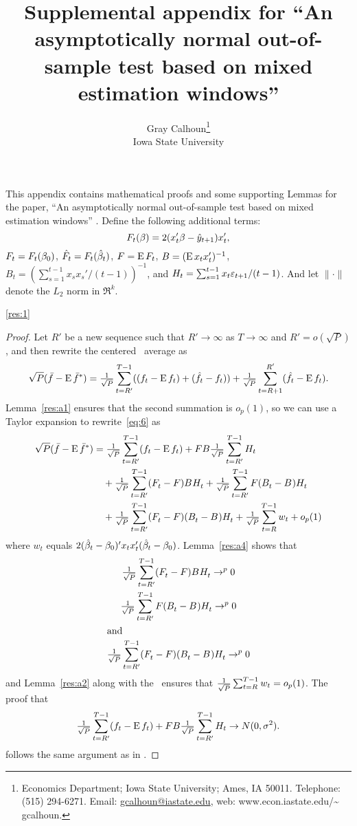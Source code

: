\documentclass[12pt,fleqn]{article}
\author{Gray Calhoun\thanks{Economics Department; Iowa State
    University; Ames, IA 50011.  Telephone: (515) 294-6271.  Email:
    \guillemotleft \protect\url{gcalhoun@iastate.edu}\guillemotright,
    web: \guillemotleft www.econ.iastate.edu/\textasciitilde
    gcalhoun\guillemotright.}\\%
  Iowa State University}
\title{Supplemental appendix for ``An asymptotically normal
  out-of-sample test based on mixed estimation windows''}
\newcommand{\WesA}[1][]{\ocltb{t}
  (F_t^{#1} - F) B^{#1} H_t^{#1}}
\newcommand{\WesB}[1][]{\ocltb{t} F (B_t^{#1} -
  B^{#1}) H_t^{#1}}
\newcommand{\WesC}[1][]{\ocltb{t}
  (F_t^{#1} - F) (B_t^{#1} - B^{#1}) H_t^{#1}}
\begin{document}
\maketitle

\noindent%
This appendix contains mathematical proofs and some supporting Lemmas
for the paper, ``An asymptotically normal out-of-sample test based on
mixed estimation windows'' \citep{Cal:15}. Define the following
additional terms:
\begin{equation*}
  F_t(\beta) = 2 (x_t'\beta - \hat{y}_{t+1}) x_t',
\end{equation*}
$F_t = F_t(\btrue)$, $\hat{F}_t = F_t(\hat{\beta}_t)$, $F = \operatorname{E} F_t$, $B = (\operatorname{E} x_t
x_t')^{-1}$, $B_t = (\sum_{s=1}^{t-1} x_s x_s' / (t-1))^{-1}$, and
$H_t = \sum_{s=1}^{t-1} x_t \varepsilon_{t+1} / (t-1)$.
And let $\lVert \cdot \rVert$ denote the $L_2$ norm in $\Re^k$.

\begin{rthm}{\ref{res:1}}\end{rthm}
\begin{proof}
  Let $R'$ be a new sequence such that $R' \to \infty$ as $T \to \infty$
  and $R' = o(\sqrt{P})$, and then rewrite the centered \oos\ average as
  \begin{equation}\label{eq:6}
    \sqrt{P} (\bar{f} - \operatorname{E} \bar{f}^*)
    = \tfrac{1}{\sqrt{P}} \sum_{t=R'}^{T-1} ((f_t - \operatorname{E} f_t) + (\hat{f}_t - f_t))
      + \tfrac{1}{\sqrt{P}} \sum_{t=R+1}^{R'} (\hat{f}_t - \operatorname{E} f_t).
  \end{equation}
  Lemma~\ref{res:a1} ensures that the second summation is $o_p(1)$, so
  we can use a Taylor expansion to rewrite~\eqref{eq:6} as
  \begin{align*}
    \sqrt{P} (\fb - \E \fb^*)
    &= \ocltb{t} (f_t - \E f_t) + F B \ocltb{t} H_t \\
    & \quad + \WesA + \WesB \\ & \quad + \WesC + \oclt{t} w_t + o_p(1)
  \end{align*}
  where $w_t$ equals $2 (\bh_t - \btrue)' x_t x_t' (\bh_t - \btrue)$.
  Lemma~\ref{res:a4} shows that
  \begin{gather}
    \WesA \to^{p} 0 \label{eq:11} \\
    \WesB \to^{p} 0 \label{eq:12} \\
    \intertext{and}
    \WesC \to^{p} 0 \label{eq:13}
  \end{gather}
  and Lemma~\ref{res:a2} along with the \clt\ ensures that $\tfrac{1}{\sqrt{P}} \sum_{t=R}^{T-1}
  w_t = o_{p}(1)$. The proof that
  \begin{equation*}
    \tfrac{1}{\sqrt{P}} \sum_{t=R'}^{T-1} (f_t - \operatorname{E} f_t) + F B \tfrac{1}{\sqrt{P}} \sum_{t=R'}^{T-1} H_t \to N(0, \sigma^2).
  \end{equation*}
  follows the same argument as in \citet{Wes:96}.
\end{proof}
\end{document}
